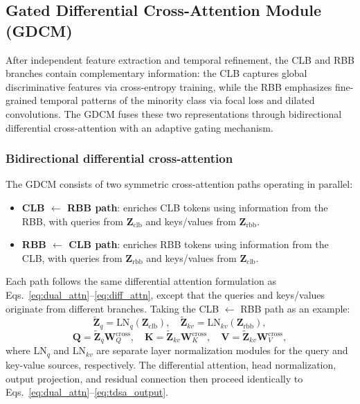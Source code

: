 \subsection{Gated Differential Cross-Attention Module (GDCM)}\label{sec:gdcm}

After independent feature extraction and temporal refinement, the CLB and RBB branches contain complementary information: the CLB captures global discriminative features via cross-entropy training, while the RBB emphasizes fine-grained temporal patterns of the minority class via focal loss and dilated convolutions. The GDCM fuses these two representations through bidirectional differential cross-attention with an adaptive gating mechanism.

\subsubsection{Bidirectional differential cross-attention}

The GDCM consists of two symmetric cross-attention paths operating in parallel:
\begin{itemize}
    \item \textbf{CLB $\leftarrow$ RBB path}: enriches CLB tokens using information from the RBB, with queries from $\mathbf{Z}_{\text{clb}}$ and keys/values from $\mathbf{Z}_{\text{rbb}}$.
    \item \textbf{RBB $\leftarrow$ CLB path}: enriches RBB tokens using information from the CLB, with queries from $\mathbf{Z}_{\text{rbb}}$ and keys/values from $\mathbf{Z}_{\text{clb}}$.
\end{itemize}

Each path follows the same differential attention formulation as Eqs.~\eqref{eq:dual_attn}--\eqref{eq:diff_attn}, except that the queries and keys/values originate from different branches. Taking the CLB $\leftarrow$ RBB path as an example:
\begin{equation}
    \tilde{\mathbf{Z}}_q = \text{LN}_q(\mathbf{Z}_{\text{clb}}), \quad
    \tilde{\mathbf{Z}}_{kv} = \text{LN}_{kv}(\mathbf{Z}_{\text{rbb}}),
\end{equation}
\begin{equation}
    \mathbf{Q} = \tilde{\mathbf{Z}}_q \mathbf{W}_Q^{\text{cross}}, \quad
    \mathbf{K} = \tilde{\mathbf{Z}}_{kv} \mathbf{W}_K^{\text{cross}}, \quad
    \mathbf{V} = \tilde{\mathbf{Z}}_{kv} \mathbf{W}_V^{\text{cross}},
\end{equation}
where $\text{LN}_q$ and $\text{LN}_{kv}$ are separate layer normalization modules for the query and key-value sources, respectively. The differential attention, head normalization, output projection, and residual connection then proceed identically to Eqs.~\eqref{eq:dual_attn}--\eqref{eq:tdsa_output}.

